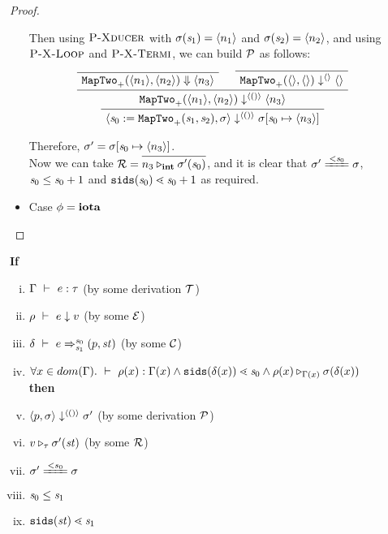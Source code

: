 \begin{proof}
\begin{itemize}
	 Then using $\textsc{P-Xducer}$ with $\sigma(\mathit{s}_1)= \langle n_1 \rangle$ and $ \sigma(\mathit{s}_2) = \langle n_2 \rangle$, 
	 and using $\textsc{P-X-Loop}$ and $\textsc{P-X-Termi}$, 
	 we can build $\mathcal{P}$ as follows: 
	 $$\PT{
		\Axiom{\blockf{\maptwo{+}}{\singl{n_1}, \singl{n_2}}{\singl{n_3}}}
		\Axiom{\sevalfg{\maptwo{+}}{\emptyv,\emptyv}{\emptyv}{\emptyv}}
		\BC{\sevalfg{\maptwo{+}}{\singl{n_1},\singl{n_2}}{\vunit}{\singl{n_3}}}
		\UC{\seval{\pplus}{\sgm}{\vunit}{\sgm[\s_0 \|-> \singl{n_3}]}}
	 }$$  
	
	
	Therefore, $\sgm' = \sgm[\s_0 \|-> \singl{n_3}]$.\\
	Now we can take $\MR = \infer{\ValRep{n_3}{\int}{\sgm'(\s_0)}}{}$,
	and it is clear that
	 $\sgm' \ConEq{\s_0} \sgm$, $\mathit{s}_0 \le \mathit{s}_0 +1$ 
	 and $\sids{\s_0} \.< \s_0+1$ as required. 
	
	\item \label{thm-case-iota} Case $\phi = \mathbf{iota}$ \\ 	
	
\end{itemize}
\end{proof}


\begin{thm}
	\label{mainthm-correctness}
	\textbf{If} 
	\begin{enumerate}[(i)]
		\item $\Gamma \ \vdash\  e : \tau$ (by some derivation $\mathcal{T}$)
		\item $\rho \ \vdash\  e \downarrow v$ (by some $\mathcal{E}$) 
		\item $\Trans{\del}{e}{\s_0}{\s_1}{\sfun{p}{\st}}$ (by some $\mathcal{C}$)
		\item \label{mainthm-assum-env} $\forall x \in dom(\Gam). \Type{}{\rho(x)}{\Gam(x) } \wedge \sids{\del(x)} \.< \s_0  \wedge  \ValRep{\rho(x)}{\Gam(x)}{\sgm(\del(x))}$ \\
	\textbf{then} 
		\item $\langle p,\sigma \rangle \downarrow^{\langle () \rangle} \sigma'$ (by some derivation $\mathcal{P}$)
		\item  $v \triangleright_{\tau} \sigma'(\mathit{st})$ (by some $\mathcal{R}$)
		\item $\sgm' \ConEq{s_0} \sgm $
	    \item $\mathit{s}_0 \le \mathit{s}_1$
		\item  $\sids{\st} \.< \s_1$
	\end{enumerate} 
\end{thm}

